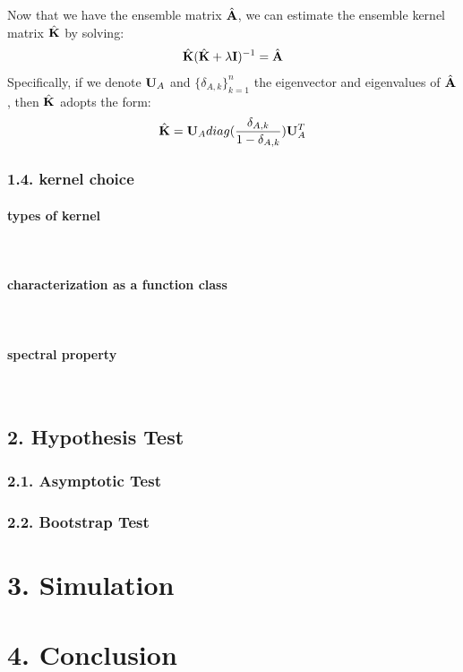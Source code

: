 \documentclass[11pt]{article}
\begin{document}
\vspace{2em}
Now that we have the ensemble matrix $\hat{{\bf A}}$, we can estimate the ensemble kernel matrix $\hat{{\bf K}}$ by solving:
\begin{align*}
\hat{{\bf K}}(\hat{{\bf K}}+\lambda {\bf I})^{-1}=\hat{{\bf A}}
\end{align*}
Specifically, if we denote ${\bf U}_A$ and $\{\delta_{A,k}\}_{k=1}^n$ the eigenvector and eigenvalues of $\hat{{\bf A}}$, then $\hat{{\bf K}}$ adopts the form:
\begin{align*}
\hat{{\bf K}}={\bf U}_A diag(\frac{\delta_{A,k}}{1-\delta_{A,k}}){\bf U}_A^T
\end{align*}



\subsubsection*{{1.4. kernel choice}}
\paragraph{types of kernel}\mbox{}\\
\paragraph{characterization as a function class}\mbox{}\\
\paragraph{spectral property}\mbox{}\\
\subsection*{{2. Hypothesis Test}}
\subsubsection*{{2.1. Asymptotic Test}}
\subsubsection*{{2.2. Bootstrap Test}}
\section*{{\bf 3. Simulation}}
\section*{{\bf 4. Conclusion}}















\end{document}
